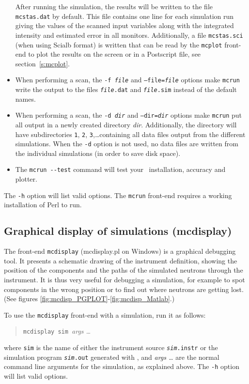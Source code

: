\begin{itemize}
After running the simulation, the results will be written to the file
\verb+mcstas.dat+ by default. This file contains one line for each
simulation run giving the values of the scanned input variables along
with the integrated intensity and estimated error in all monitors. Additionally, a
file \verb+mcstas.sci+ (when using Scialb format) is written that can be read by the \verb+mcplot+
front-end to plot the results on the screen or in a Postscript file, see
section~\ref{s:mcplot}. 
\item When performing a scan, the \texttt{-f {\it file}} and
  \texttt{--file={\it file}} options make \verb+mcrun+ write the output
  to the files \texttt{{\it file\/}.dat} and \texttt{{\it file\/}.sim}
  instead of the default names.
\item When performing a scan, the \texttt{-d {\it dir}} and
  \texttt{--dir={\it dir}} options make \verb+mcrun+ put all output in a
  newly created directory \textit{dir}. Additionally, the directory will
  have subdirectories \verb+1+, \verb+2+, \verb+3+,\ldots containing all
  data files output from the different simulations. When the \verb+-d+
  option is not used, no data files are written from the individual
  simulations (in order to save disk space).
\item The \verb+mcrun --test+ command will test your \MCS\ installation, accuracy and plotter. 
\end{itemize}

The \verb+-h+ option will list valid options. The \verb+mcrun+ front-end requires a working installation of Perl to run.


\subsection{Graphical display of simulations (mcdisplay)}
\label{s:mcdisplay}

The front-end \verb+mcdisplay+ (mcdisplay.pl on Windows) is a graphical debugging tool.
It presents a schematic drawing of the instrument
definition, showing the position of the components and the paths of the
simulated neutrons through the instrument. It is thus very useful for
debugging a simulation, for example to spot components in the wrong
position or to find out where neutrons are getting lost.
(See figures \ref{fig:mcdisp_PGPLOT}-\ref{fig:mcdisp_Matlab}.)

To use the \verb+mcdisplay+ front-end with a simulation, run it as
follows:
\begin{quote}
  \verb+mcdisplay sim +{\it args \ldots}
\end{quote}
where \verb+sim+ is the name of either the instrument source \texttt{{\it sim}.instr} or the simulation program \texttt{{\it sim}.out} generated with
\MCS, and \textit{args \ldots} are the normal command line arguments for
the simulation, as explained above. The \verb+-h+ option will list valid options.

